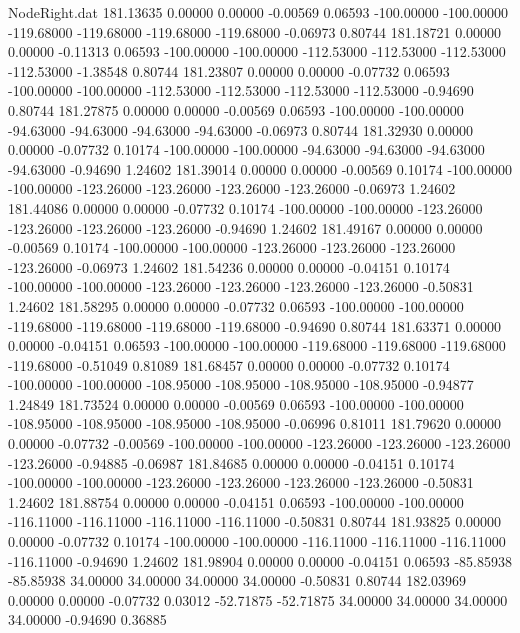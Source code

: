 \begin{filecontents}{NodeRight.dat}
 181.13635    0.00000    0.00000    -0.00569    0.06593 -100.00000 -100.00000 -119.68000 -119.68000 -119.68000 -119.68000   -0.06973    0.80744
 181.18721    0.00000    0.00000    -0.11313    0.06593 -100.00000 -100.00000 -112.53000 -112.53000 -112.53000 -112.53000   -1.38548    0.80744
 181.23807    0.00000    0.00000    -0.07732    0.06593 -100.00000 -100.00000 -112.53000 -112.53000 -112.53000 -112.53000   -0.94690    0.80744
 181.27875    0.00000    0.00000    -0.00569    0.06593 -100.00000 -100.00000  -94.63000  -94.63000  -94.63000  -94.63000   -0.06973    0.80744
 181.32930    0.00000    0.00000    -0.07732    0.10174 -100.00000 -100.00000  -94.63000  -94.63000  -94.63000  -94.63000   -0.94690    1.24602
 181.39014    0.00000    0.00000    -0.00569    0.10174 -100.00000 -100.00000 -123.26000 -123.26000 -123.26000 -123.26000   -0.06973    1.24602
 181.44086    0.00000    0.00000    -0.07732    0.10174 -100.00000 -100.00000 -123.26000 -123.26000 -123.26000 -123.26000   -0.94690    1.24602
 181.49167    0.00000    0.00000    -0.00569    0.10174 -100.00000 -100.00000 -123.26000 -123.26000 -123.26000 -123.26000   -0.06973    1.24602
 181.54236    0.00000    0.00000    -0.04151    0.10174 -100.00000 -100.00000 -123.26000 -123.26000 -123.26000 -123.26000   -0.50831    1.24602
 181.58295    0.00000    0.00000    -0.07732    0.06593 -100.00000 -100.00000 -119.68000 -119.68000 -119.68000 -119.68000   -0.94690    0.80744
 181.63371    0.00000    0.00000    -0.04151    0.06593 -100.00000 -100.00000 -119.68000 -119.68000 -119.68000 -119.68000   -0.51049    0.81089
 181.68457    0.00000    0.00000    -0.07732    0.10174 -100.00000 -100.00000 -108.95000 -108.95000 -108.95000 -108.95000   -0.94877    1.24849
 181.73524    0.00000    0.00000    -0.00569    0.06593 -100.00000 -100.00000 -108.95000 -108.95000 -108.95000 -108.95000   -0.06996    0.81011
 181.79620    0.00000    0.00000    -0.07732   -0.00569 -100.00000 -100.00000 -123.26000 -123.26000 -123.26000 -123.26000   -0.94885   -0.06987
 181.84685    0.00000    0.00000    -0.04151    0.10174 -100.00000 -100.00000 -123.26000 -123.26000 -123.26000 -123.26000   -0.50831    1.24602
 181.88754    0.00000    0.00000    -0.04151    0.06593 -100.00000 -100.00000 -116.11000 -116.11000 -116.11000 -116.11000   -0.50831    0.80744
 181.93825    0.00000    0.00000    -0.07732    0.10174 -100.00000 -100.00000 -116.11000 -116.11000 -116.11000 -116.11000   -0.94690    1.24602
 181.98904    0.00000    0.00000    -0.04151    0.06593  -85.85938  -85.85938   34.00000   34.00000   34.00000   34.00000   -0.50831    0.80744
 182.03969    0.00000    0.00000    -0.07732    0.03012  -52.71875  -52.71875   34.00000   34.00000   34.00000   34.00000   -0.94690    0.36885

\end{filecontents}
